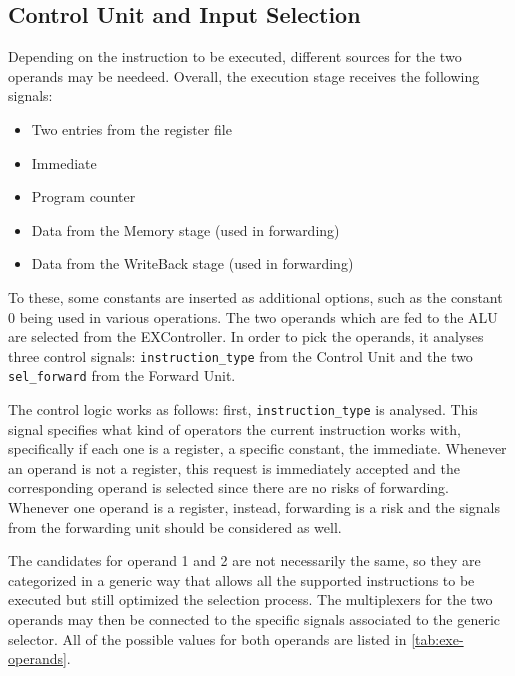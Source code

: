 \subsection{Control Unit and Input Selection}
Depending on the instruction to be executed, different sources for the two operands may be needeed. Overall, the
execution stage receives the following signals:
\begin{itemize}
    \item Two entries from the register file
    \item Immediate
    \item Program counter
    \item Data from the Memory stage (used in forwarding)
    \item Data from the WriteBack stage (used in forwarding)
\end{itemize}
To these, some constants are inserted as additional options, such as the constant 0 being used in various operations.
The two operands which are fed to the ALU are selected from the EXController. In order to
pick the operands, it analyses three control signals: \texttt{instruction\_type} from the Control Unit and the two
\texttt{sel\_forward} from the Forward Unit.

The control logic works as follows: first, \texttt{instruction\_type} is analysed. This signal specifies what kind of
operators the current instruction works with, specifically if each one is a register, a specific constant,
the immediate. Whenever an operand is not a register, this request is immediately accepted and the corresponding
operand is selected since there are no risks of forwarding. Whenever one operand is a register, instead, forwarding is
a risk and the signals from the forwarding unit should be considered as well.

The candidates for operand 1 and 2 are not necessarily the same, so they are categorized in a generic way that allows
all the supported instructions to be executed but still optimized the selection process. The multiplexers for the two
operands may then be connected to the specific signals associated to the generic selector.
All of the possible values for both operands are listed in \autoref{tab:exe-operands}.

